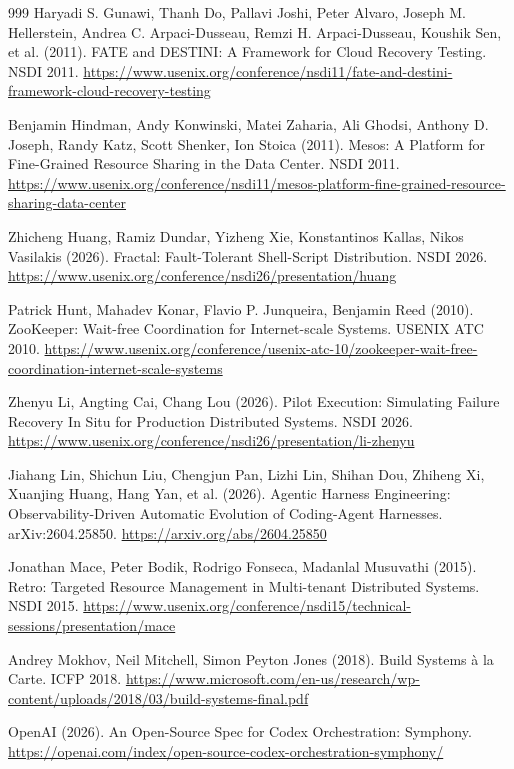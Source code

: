 \begin{thebibliography}{999}
 Haryadi S. Gunawi, Thanh Do, Pallavi Joshi, Peter Alvaro, Joseph M. Hellerstein, Andrea C. Arpaci-Dusseau, Remzi H. Arpaci-Dusseau, Koushik Sen, et al. (2011). FATE and DESTINI: A Framework for Cloud Recovery Testing. NSDI 2011. \url{https://www.usenix.org/conference/nsdi11/fate-and-destini-framework-cloud-recovery-testing}

 Benjamin Hindman, Andy Konwinski, Matei Zaharia, Ali Ghodsi, Anthony D. Joseph, Randy Katz, Scott Shenker, Ion Stoica (2011). Mesos: A Platform for Fine-Grained Resource Sharing in the Data Center. NSDI 2011. \url{https://www.usenix.org/conference/nsdi11/mesos-platform-fine-grained-resource-sharing-data-center}

 Zhicheng Huang, Ramiz Dundar, Yizheng Xie, Konstantinos Kallas, Nikos Vasilakis (2026). Fractal: Fault-Tolerant Shell-Script Distribution. NSDI 2026. \url{https://www.usenix.org/conference/nsdi26/presentation/huang}

 Patrick Hunt, Mahadev Konar, Flavio P. Junqueira, Benjamin Reed (2010). ZooKeeper: Wait-free Coordination for Internet-scale Systems. USENIX ATC 2010. \url{https://www.usenix.org/conference/usenix-atc-10/zookeeper-wait-free-coordination-internet-scale-systems}

 Zhenyu Li, Angting Cai, Chang Lou (2026). Pilot Execution: Simulating Failure Recovery In Situ for Production Distributed Systems. NSDI 2026. \url{https://www.usenix.org/conference/nsdi26/presentation/li-zhenyu}

 Jiahang Lin, Shichun Liu, Chengjun Pan, Lizhi Lin, Shihan Dou, Zhiheng Xi, Xuanjing Huang, Hang Yan, et al. (2026). Agentic Harness Engineering: Observability-Driven Automatic Evolution of Coding-Agent Harnesses. arXiv:2604.25850. \url{https://arxiv.org/abs/2604.25850}

 Jonathan Mace, Peter Bodik, Rodrigo Fonseca, Madanlal Musuvathi (2015). Retro: Targeted Resource Management in Multi-tenant Distributed Systems. NSDI 2015. \url{https://www.usenix.org/conference/nsdi15/technical-sessions/presentation/mace}

 Andrey Mokhov, Neil Mitchell, Simon Peyton Jones (2018). Build Systems à la Carte. ICFP 2018. \url{https://www.microsoft.com/en-us/research/wp-content/uploads/2018/03/build-systems-final.pdf}

 OpenAI (2026). An Open-Source Spec for Codex Orchestration: Symphony. \url{https://openai.com/index/open-source-codex-orchestration-symphony/}


\end{thebibliography}

